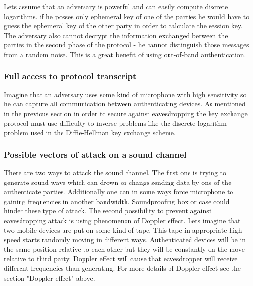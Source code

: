 \documentclass[11pt,titlepage]{article}
\theoremstyle{plain}
\begin{document}
\vspace{5mm}

Lets assume that an adversary is powerful and can easily compute discrete logarithms, if he posses only ephemeral key of one of the parties he would have to guess the ephemeral key of the other party in order to calculate the session key. The adversary also cannot decrypt the information exchanged between the parties in the second phase of the protocol - he cannot distinguish those messages from a random noise. This is a great benefit of using out-of-band authentication.

\subsubsection{Full access to protocol transcript}
Imagine that an adversary uses some kind of microphone with high sensitivity so he can capture all communication between authenticating devices. As mentioned in the previous section in order to secure against eavesdropping the key exchange protocol must use difficulty to inverse problems like the discrete logarithm problem used in the Diffie-Hellman key exchange scheme.

\subsubsection{Possible vectors of attack on a sound channel}
There are two ways to attack the sound channel. The first one is trying to generate sound wave which can drown or change sending data by one of the authenticate parties. Additionally one can in some ways force microphone to gaining frequencies in another bandwidth. Soundproofing box or case could hinder these type of attack. The second possibility to prevent against eavesdropping attack is using phenomenon of Doppler effect. Lets imagine that two mobile devices are put on some kind of tape. This tape in appropriate high speed starts randomly moving in different ways. Authenticated devices will be in the same position relative to each other but they will be constantly on the move relative to third party. Doppler effect will cause that eavesdropper will receive different frequencies than generating. For more details of Doppler effect see the section "Doppler effect" above.
\end{document}
